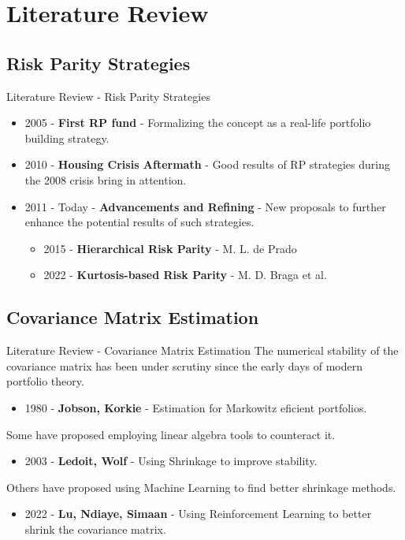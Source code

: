 \documentclass{beamer}
\begin{document}
\section{Literature Review}
\subsection{Risk Parity Strategies}
\begin{frame}{Literature Review - Risk Parity Strategies}
    \begin{itemize}
        \item 2005 - \textbf{First RP fund} - Formalizing the concept as a real-life portfolio building strategy. %
        \item 2010 - \textbf{Housing Crisis Aftermath} - Good results of RP strategies during the 2008 crisis bring in attention. %
        \item 2011 - Today - \textbf{Advancements and Refining} - New proposals to further enhance the potential results of such strategies.
        \begin{itemize}
            \item 2015 - \textbf{Hierarchical Risk Parity} - M. L. de Prado
            \item 2022 - \textbf{Kurtosis-based Risk Parity} -  M. D. Braga et al.
        \end{itemize}
    \end{itemize}
\end{frame}

\subsection{Covariance Matrix Estimation}
\begin{frame}{Literature Review - Covariance Matrix Estimation}
    The numerical stability of the covariance matrix has been under scrutiny since the early days of modern portfolio theory.
    \begin{itemize}
        \item 1980 - \textbf{Jobson, Korkie} - Estimation for Markowitz eficient portfolios.
    \end{itemize}
    Some have proposed employing linear algebra tools to counteract it.
    \begin{itemize}
        \item 2003 - \textbf{Ledoit, Wolf} - Using Shrinkage to improve stability. 
    \end{itemize}
    Others have proposed using Machine Learning to find better shrinkage methods.
    \begin{itemize}
        \item 2022 - \textbf{Lu, Ndiaye, Simaan} - Using Reinforcement Learning to better shrink the covariance matrix.
    \end{itemize}
\end{frame}
\end{document}
